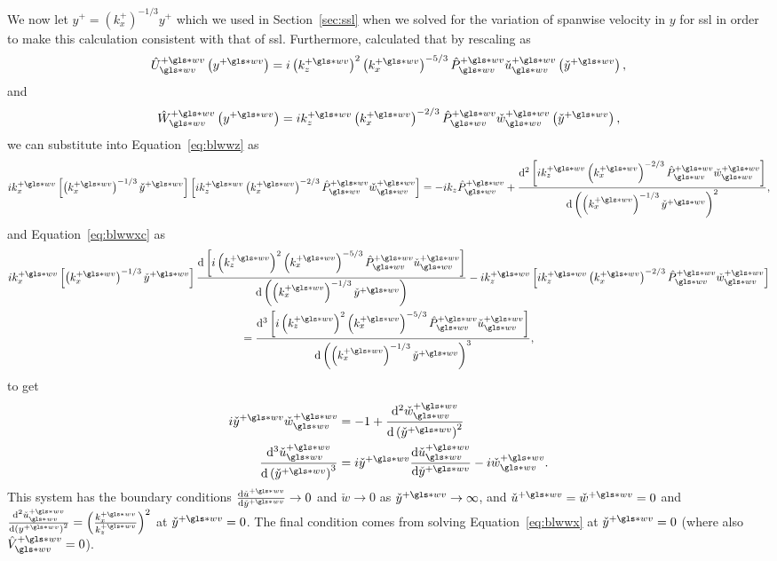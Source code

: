 We now let $y^{+}=\left( k_x^{+} \right) ^{-1 /3}y^{+}$ which we used in Section~\ref{sec:ssl} when we solved for the variation of spanwise velocity in $y$ for  \gls{ssl} in order to make this calculation consistent with that of \gls{ssl}. Furthermore, \textcite{chernyshenko2013} calculated that by rescaling as
\begin{equation}
	\hat{U}\pw\ww \left( y\pw \right)  = i\left( k_z\pw \right) ^2 \left( k_x\pw \right) ^{-5 /3}  \hat{P}\pw\ww \check{u}\pw\ww \left( \check{y}\pw \right)
,\end{equation}
and
\begin{equation}
	\hat{W}\pw\ww \left( y\pw \right) = ik_z\pw \left( k_x\pw \right) ^{-2 /3}\hat{P}\pw\ww \check{w}\pw\ww \left( \check{y}\pw \right)
,\end{equation}
we can substitute into Equation~\eqref{eq:blwwz} as
\begin{equation*}
	ik_x\pw \left[ \left( k_x\pw \right) ^{-1 /3} \check{y}\pw\right] \left[ i k_z\pw \left( k_x\pw \right) ^{-2 /3}\hat{P}\pw\ww \check{w}\pw\ww \right] = -ik_z \hat{P}\ww\pw\nonumber+\dv[2]{\left[i k_z\pw \left( k_x\pw \right) ^{-2 /3}\hat{P}\pw\ww \check{w}\pw\ww\right]}{\left(\left( k_x\pw \right) ^{-1 /3} \check{y}\pw\right)}
,\end{equation*}
and Equation~\eqref{eq:blwwxc} as
\begin{multline*}
	ik_x\pw \left[ \left( k_x\pw \right) ^{-1 /3} \check{y}\pw\right]\dv{\left[i\left( k_z\pw \right) ^2 \left( k_x\pw \right) ^{-5 /3}  \hat{P}\pw\ww \check{u}\pw\ww \right]}{\left( \left( k_x\pw \right) ^{-1 /3} \check{y}\pw\right)} - ik_z\pw \left[ ik_z\pw \left( k_x\pw \right) ^{-2 /3}\hat{P}\pw\ww \check{w}\pw\ww \right] \\
	=\dv[3]{\left[i\left( k_z\pw \right) ^2 \left( k_x\pw \right) ^{-5 /3}  \hat{P}\pw\ww \check{u}\pw\ww \right]}{\left( \left( k_x\pw \right) ^{-1 /3} \check{y}\pw\right)}
,\end{multline*}
to get
\begin{align}
	i\check{y}\pw \check{w}\pw\ww&=-1+\dv[2]{\check{w}\pw\ww}{\left( \check{y}\pw \right) }\label{eq:blwwzsim} \\
	\dv[3]{\check{u}\pw\ww}{\left( \check{y}\pw \right) } &= i\check{y}\pw \dv{\check{u}\pw\ww}{\check{y}\pw} -i\check{w}\pw\ww\label{eq:blwwxsim}
.\end{align}
This system has the boundary conditions $\dv{\check{u}\pw}{\check{y}\pw}\to0 $ and $\check{w}\to0$ as $\check{y}\pw\to\infty$, and $\check{u}\pw=\check{w}\pw=0$ and $\dv[2]{\check{u}\pw\ww}{\left( y\pw \right) } =\left(\frac{k_x\pw}{k_z\pw}\right)^2$ at $\check{y}\pw=0$. The final condition comes from solving Equation~\eqref{eq:blwwx} at $\check{y}\pw=0$ (where also $\hat{V}\pw\ww=0$).

